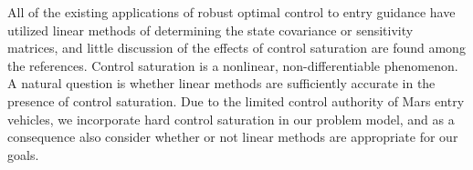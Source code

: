 All of the existing applications of robust optimal control to entry guidance have utilized linear methods of determining the state covariance or sensitivity matrices, and little discussion of the effects of control saturation are found among the references. Control saturation is a nonlinear, non-differentiable phenomenon. A natural question is whether linear methods are sufficiently accurate in the presence of control saturation. Due to the limited control authority of Mars entry vehicles, we incorporate hard control saturation in our problem model, and as a consequence also consider whether or not linear methods are appropriate for our goals.



